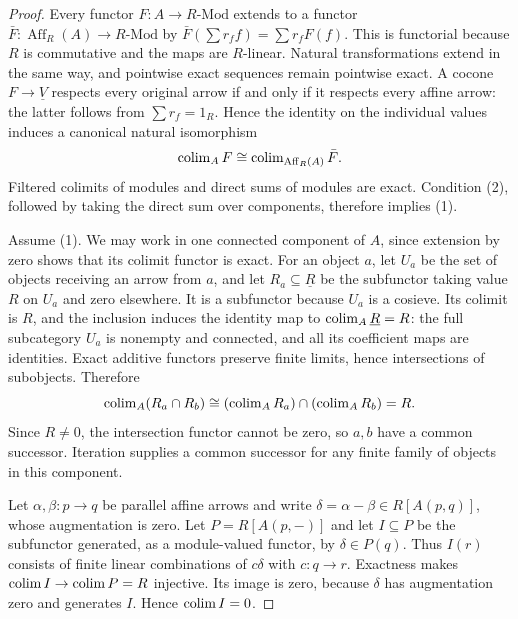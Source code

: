 \begin{proof}
Every functor $F:A\to R\text{-}\mathrm{Mod}$ extends to a functor $\bar F:\operatorname{Aff}_R(A)\to R\text{-}\mathrm{Mod}$ by
$\bar F(\sum r_ff)=\sum r_fF(f)$. This is functorial because $R$ is commutative and the maps are $R$-linear. Natural transformations extend in the same way, and pointwise exact sequences remain pointwise exact. A cocone $F\to\underline V$ respects every original arrow if and only if it respects every affine arrow: the latter follows from $\sum r_f=1_R$. Hence the identity on the individual values induces a canonical natural isomorphism
\[
 \operatorname{colim}_A F\cong\operatorname{colim}_{\operatorname{Aff}_R(A)}\bar F.
\]
Filtered colimits of modules and direct sums of modules are exact. Condition (2), followed by taking the direct sum over components, therefore implies (1).

Assume (1). We may work in one connected component of $A$, since extension by zero shows that its colimit functor is exact. For an object $a$, let $U_a$ be the set of objects receiving an arrow from $a$, and let $R_a\subseteq\underline R$ be the subfunctor taking value $R$ on $U_a$ and zero elsewhere. It is a subfunctor because $U_a$ is a cosieve. Its colimit is $R$, and the inclusion induces the identity map to $\operatorname{colim}_A\underline R=R$: the full subcategory $U_a$ is nonempty and connected, and all its coefficient maps are identities. Exact additive functors preserve finite limits, hence intersections of subobjects. Therefore
\[
 \operatorname{colim}_A(R_a\cap R_b)
 \cong(\operatorname{colim}_A R_a)\cap(\operatorname{colim}_A R_b)=R.
\]
Since $R\ne0$, the intersection functor cannot be zero, so $a,b$ have a common successor. Iteration supplies a common successor for any finite family of objects in this component.

Let $\alpha,\beta:p\to q$ be parallel affine arrows and write $\delta=\alpha-\beta\in R[A(p,q)]$, whose augmentation is zero. Let $P=R[A(p,-)]$ and let $I\subseteq P$ be the subfunctor generated, as a module-valued functor, by $\delta\in P(q)$. Thus $I(r)$ consists of finite linear combinations of $c\delta$ with $c:q\to r$. Exactness makes $\operatorname{colim} I\to\operatorname{colim} P=R$ injective. Its image is zero, because $\delta$ has augmentation zero and generates $I$. Hence $\operatorname{colim} I=0$.


\end{proof}
